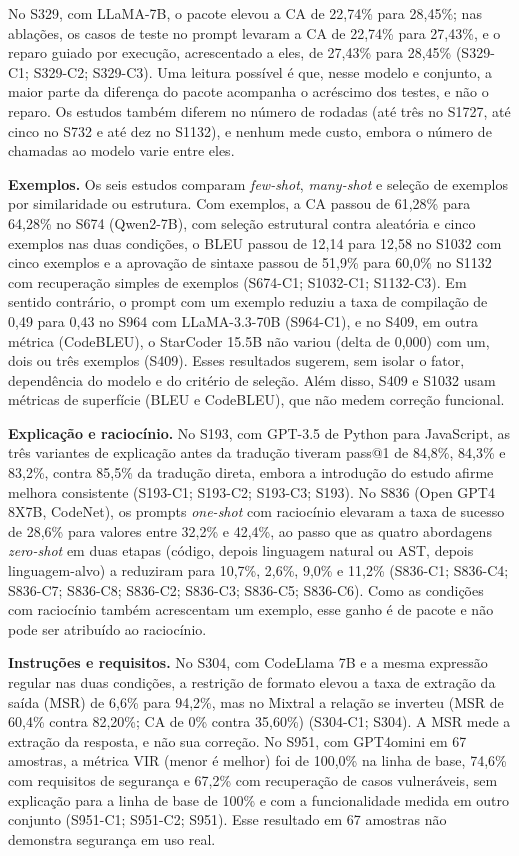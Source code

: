 No S329, com LLaMA-7B, o pacote elevou a CA de 22,74\% para 28,45\%; nas ablações, os casos de teste no prompt levaram a CA de 22,74\% para 27,43\%, e o reparo guiado por execução, acrescentado a eles, de 27,43\% para 28,45\% (S329-C1; S329-C2; S329-C3).
Uma leitura possível é que, nesse modelo e conjunto, a maior parte da diferença do pacote acompanha o acréscimo dos testes, e não o reparo. Os estudos também diferem no número de rodadas (até três no S1727, até cinco no S732 e até dez no S1132), e nenhum mede custo, embora o número de chamadas ao modelo varie entre eles.

\textbf{Exemplos.} Os seis estudos comparam \textit{few-shot}, \textit{many-shot} e seleção de exemplos por similaridade ou estrutura.
Com exemplos, a CA passou de 61,28\% para 64,28\% no S674 (Qwen2-7B), com seleção estrutural contra aleatória e cinco exemplos nas duas condições, o BLEU passou de 12,14 para 12,58 no S1032 com cinco exemplos e a aprovação de sintaxe passou de 51,9\% para 60,0\% no S1132 com recuperação simples de exemplos (S674-C1; S1032-C1; S1132-C3).
Em sentido contrário, o prompt com um exemplo reduziu a taxa de compilação de 0,49 para 0,43 no S964 com LLaMA-3.3-70B (S964-C1), e no S409, em outra métrica (CodeBLEU), o StarCoder 15.5B não variou (delta de 0,000) com um, dois ou três exemplos (S409).
Esses resultados sugerem, sem isolar o fator, dependência do modelo e do critério de seleção. Além disso, S409 e S1032 usam métricas de superfície (BLEU e CodeBLEU), que não medem correção funcional.

\textbf{Explicação e raciocínio.}
No S193, com GPT-3.5 de Python para JavaScript, as três variantes de explicação antes da tradução tiveram pass@1 de 84,8\%, 84,3\% e 83,2\%, contra 85,5\% da tradução direta, embora a introdução do estudo afirme melhora consistente (S193-C1; S193-C2; S193-C3; S193).
No S836 (Open GPT4 8X7B, CodeNet), os prompts \textit{one-shot} com raciocínio elevaram a taxa de sucesso de 28,6\% para valores entre 32,2\% e 42,4\%, ao passo que as quatro abordagens \textit{zero-shot} em duas etapas (código, depois linguagem natural ou AST, depois linguagem-alvo) a reduziram para 10,7\%, 2,6\%, 9,0\% e 11,2\% (S836-C1; S836-C4; S836-C7; S836-C8; S836-C2; S836-C3; S836-C5; S836-C6).
Como as condições com raciocínio também acrescentam um exemplo, esse ganho é de pacote e não pode ser atribuído ao raciocínio.

\textbf{Instruções e requisitos.}
No S304, com CodeLlama 7B e a mesma expressão regular nas duas condições, a restrição de formato elevou a taxa de extração da saída (MSR) de 6,6\% para 94,2\%, mas no Mixtral a relação se inverteu (MSR de 60,4\% contra 82,20\%; CA de 0\% contra 35,60\%) (S304-C1; S304).
A MSR mede a extração da resposta, e não sua correção.
No S951, com GPT4omini em 67 amostras, a métrica VIR (menor é melhor) foi de 100,0\% na linha de base, 74,6\% com requisitos de segurança e 67,2\% com recuperação de casos vulneráveis, sem explicação para a linha de base de 100\% e com a funcionalidade medida em outro conjunto (S951-C1; S951-C2; S951).
Esse resultado em 67 amostras não demonstra segurança em uso real.

